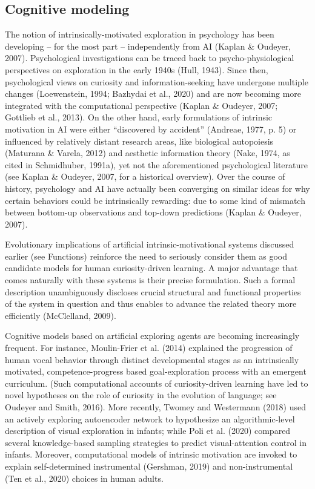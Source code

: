 \subsection{Cognitive modeling} The notion of intrinsically-motivated exploration in psychology has been developing -- for the most part -- independently from \ac{AI} (Kaplan \& Oudeyer, 2007). Psychological investigations can be traced back to psycho-physiological perspectives on exploration in the early 1940s (Hull, 1943). Since then, psychological views on curiosity and information-seeking have undergone multiple changes (Loewenstein, 1994; Bazhydai et al., 2020) and are now becoming more integrated with the computational perspective (Kaplan \& Oudeyer, 2007; Gottlieb et al., 2013). On the other hand, early formulations of intrinsic motivation in \ac{AI} were either “discovered by accident” (Andreae, 1977, p. 5) or influenced by relatively distant research areas, like biological autopoiesis (Maturana \& Varela, 2012) and aesthetic information theory (Nake, 1974, as cited in Schmidhuber, 1991a), yet not the aforementioned psychological literature (see Kaplan \& Oudeyer, 2007, for a historical overview). Over the course of history, psychology and \ac{AI} have actually been converging on similar ideas for why certain behaviors could be intrinsically rewarding: due to some kind of mismatch between bottom-up observations and top-down predictions (Kaplan \& Oudeyer, 2007).

Evolutionary implications of artificial intrinsic-motivational systems discussed earlier (see Functions) reinforce the need to seriously consider them as good candidate models for human curiosity-driven learning. A major advantage that comes naturally with these systems is their precise formulation. Such a formal description unambiguously discloses crucial structural and functional properties of the system in question and thus enables to advance the related theory more efficiently (McClelland, 2009). 

Cognitive models based on artificial exploring agents are becoming increasingly frequent. For instance, Moulin-Frier et al. (2014) explained the progression of human vocal behavior through distinct developmental stages as an intrinsically motivated, competence-progress based goal-exploration process with an emergent curriculum. (Such computational accounts of curiosity-driven learning have led to novel hypotheses on the role of curiosity in the evolution of language; see Oudeyer and Smith, 2016). More recently, Twomey and Westermann (2018) used an actively exploring autoencoder network to hypothesize an algorithmic-level description of visual exploration in infants; while Poli et al. (2020) compared several knowledge-based sampling strategies to predict visual-attention control in infants. Moreover, computational models of intrinsic motivation are invoked to explain self-determined instrumental (Gershman, 2019) and non-instrumental (Ten et al., 2020) choices in human adults.


